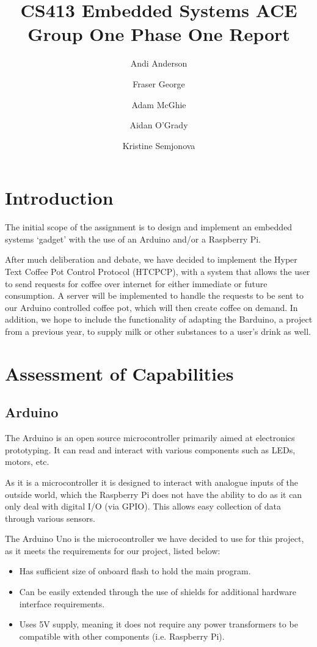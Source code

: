 \documentclass[12pt, a4paper]{article}
\begin{document}
\title{CS413 Embedded Systems ACE Group One Phase One Report}
\author{Andi Anderson \and Fraser George \and Adam McGhie \and Aidan O'Grady
\and Kristine Semjonova}
\date{}
\maketitle
\newpage
\tableofcontents
\newpage

\section{Introduction}
The initial scope of the assignment is to design and implement an embedded
systems ‘gadget’ with the use of an Arduino and/or a Raspberry Pi.

After much deliberation and debate, we have decided to implement the Hyper Text 
Coffee Pot Control Protocol (HTCPCP)\cite{HTCPCP}, with a system that allows
the user to send requests for coffee over  internet for either immediate or
future consumption. A server will be implemented to handle the requests to be
sent to our Arduino controlled coffee pot, which will then create coffee on
demand. In addition, we hope to include the functionality of adapting the
Barduino, a project from a previous year, to supply milk or other substances to
a user’s drink as well.

\newpage

\section{Assessment of Capabilities}
\subsection{Arduino}
The Arduino is an open source microcontroller primarily aimed at electronics
prototyping. It can read and interact with various components such as LEDs,
motors, etc.

As it is a microcontroller it is designed to interact with analogue inputs of
the outside world, which the Raspberry Pi does not have the ability to do as it
can only deal with digital I/O (via GPIO). This allows easy collection of data
through various sensors. 

The Arduino Uno is the microcontroller we have decided to use for this project,
as it meets the requirements for our project, listed below:

\begin{itemize}
	\item Has sufficient size of onboard flash to hold the main program.
	\item Can be easily extended through the use of shields for additional hardware
	interface requirements.
	\item Uses 5V supply, meaning it does not require any power transformers to
	be compatible with other components (i.e. Raspberry Pi).
\end{itemize}
\end{document}
